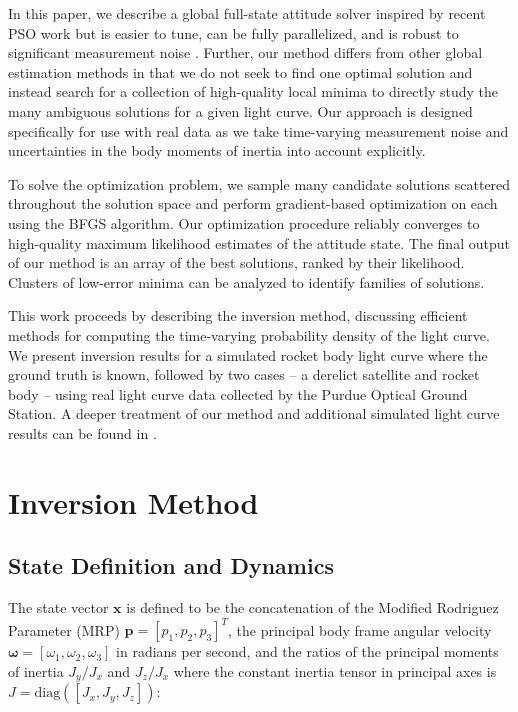 \documentclass[a4paper,twocolumn]{spaceDebrisC} %
\newcommand{\vctr}[1]{\bm{#1}}
\begin{document}
In this paper, we describe a global full-state attitude solver inspired by recent PSO work \cite{burton2024journal} but is easier to tune, can be fully parallelized, and is robust to significant measurement noise \cite{robinson2025att}. Further, our method differs from other global estimation methods in that we do not seek to find one optimal solution and instead search for a collection of high-quality local minima to directly study the many ambiguous solutions for a given light curve. Our approach is designed specifically for use with real data as we take time-varying measurement noise and uncertainties in the body moments of inertia into account explicitly. 

To solve the optimization problem, we sample many candidate solutions scattered throughout the solution space and perform gradient-based optimization on each using the BFGS algorithm. Our optimization procedure reliably converges to high-quality maximum likelihood estimates of the attitude state. The final output of our method is an array of the best solutions, ranked by their likelihood. Clusters of low-error minima can be analyzed to identify families of solutions.

This work proceeds by describing the inversion method, discussing efficient methods for computing the time-varying probability density of the light curve. We present inversion results for a simulated rocket body light curve where the ground truth is known, followed by two cases -- a derelict satellite and rocket body -- using real light curve data collected by the Purdue Optical Ground Station. A deeper treatment of our method and additional simulated light curve results can be found in \cite{robinson2025att}.

\section{Inversion Method}

\subsection{State Definition and Dynamics}

The state vector $\vctr{x}$ is defined to be the concatenation of the Modified Rodriguez Parameter (MRP) $\vctr{p} = [p_1, p_2, p_3]^T$, the principal body frame angular velocity $\vctr{\omega} = [\omega_1, \omega_2, \omega_3]$ in radians per second, and the ratios of the principal moments of inertia $J_y / J_x$ and $J_z / J_x$ where the constant inertia tensor in principal axes is $J = \mathrm{diag}\left([J_x, J_y, J_z]\right)$:
\end{document}
